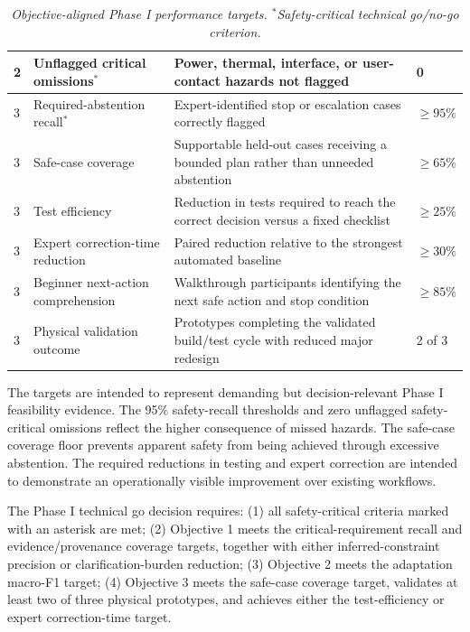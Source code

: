 \documentclass[11pt,letterpaper]{article}
\begin{document}
\begin{table}[H]
\begin{tabularx}{\textwidth}{
P{0.035\textwidth}
P{0.255\textwidth}
Y
P{0.05\textwidth}}
2 &
Unflagged critical omissions$^{*}$ &
Power, thermal, interface, or user-contact hazards not flagged &
0 \\

\midrule

3 &
Required-abstention recall$^{*}$ &
Expert-identified stop or escalation cases correctly flagged &
$\geq 95\%$ \\

3 &
Safe-case coverage &
Supportable held-out cases receiving a bounded plan rather than unneeded abstention &
$\geq 65\%$ \\

3 &
Test efficiency &
Reduction in tests required to reach the correct decision versus a fixed checklist &
$\geq 25\%$ \\

3 &
Expert correction-time reduction &
Paired reduction relative to the strongest automated baseline &
$\geq 30\%$ \\

3 &
Beginner next-action comprehension &
Walkthrough participants identifying the next safe action and stop condition &
$\geq 85\%$ \\

3 &
Physical validation outcome &
Prototypes completing the validated build/test cycle with reduced major redesign &
2 of 3 \\

\bottomrule
\end{tabularx}
\caption{\textit{Objective-aligned Phase I performance targets. $^{*}$Safety-critical technical go/no-go criterion.}}
\label{tab:metrics}
\end{table}
\vspace{-10pt}

The targets are intended to represent demanding but decision-relevant Phase I feasibility evidence. The 95\% safety-recall thresholds and zero unflagged safety-critical omissions reflect the higher consequence of missed hazards. The safe-case coverage floor prevents apparent safety from being achieved through excessive abstention. The required reductions in testing and expert correction are intended to demonstrate an operationally visible improvement over existing workflows.


The Phase I technical go decision requires: 
(1) all safety-critical criteria marked with an asterisk are met;
(2) Objective 1 meets the critical-requirement recall and evidence/provenance coverage targets, together with either inferred-constraint precision or clarification-burden reduction;
(3) Objective 2 meets the adaptation macro-F1 target;
(4) Objective 3 meets the safe-case coverage target, validates at least two of three physical prototypes, and achieves either the test-efficiency or expert correction-time target.
\end{document}
